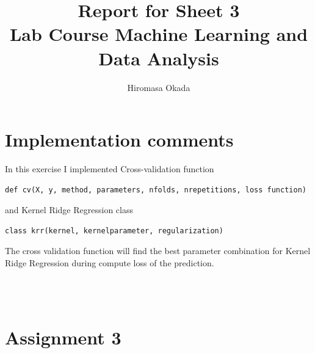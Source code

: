 \documentclass[a4paper,11pt]{article}
\begin{document}
\author{Hiromasa Okada}
\title{\vspace{-2cm}Report for Sheet 3\\
\small{Lab Course Machine Learning and Data Analysis}}
\maketitle

\section*{Implementation comments}
In this exercise I implemented Cross-validation function 

\begin{verbatim}
def cv(X, y, method, parameters, nfolds, nrepetitions, loss function)
\end{verbatim}
and Kernel Ridge Regression class 

\begin{verbatim}
class krr(kernel, kernelparameter, regularization)
\end{verbatim}

The cross validation function will find the best parameter combination for Kernel Ridge Regression during compute loss of the prediction.


\begin{verbatim}



\end{verbatim}


\section*{Assignment 3}
\end{document}
